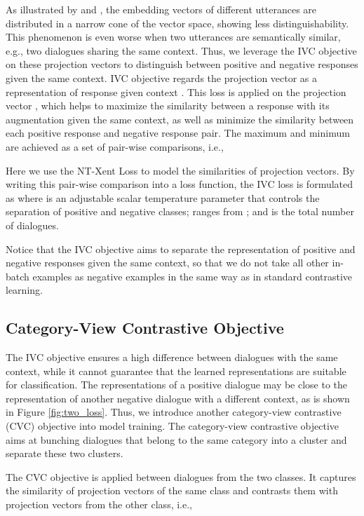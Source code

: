 \documentclass[letterpaper]{article} \usepackage{aaai22}  \usepackage{times}  \usepackage{helvet}  \usepackage{courier}  \usepackage[hyphens]{url}  \usepackage{graphicx} \urlstyle{rm} \def\UrlFont{\rm}  \usepackage{natbib}  \usepackage{caption} \DeclareCaptionStyle{ruled}{labelfont=normalfont,labelsep=colon,strut=off} \frenchspacing  \setlength{\pdfpagewidth}{8.5in}  \setlength{\pdfpageheight}{11in}  \usepackage{algorithm}
\begin{document}
As illustrated by \citet{ethayarajh-2019-contextual} and \citet{li-etal-2020-sentence}, the embedding vectors of different utterances are distributed in a narrow cone of the vector space, showing less distinguishability. This phenomenon is even worse when two utterances are semantically similar, e.g., two dialogues sharing the same context. Thus, we leverage the IVC objective on these projection vectors  to distinguish between positive and negative responses given the same context. IVC objective regards the projection vector  as a representation of response  given context . This loss is applied on the projection vector , which helps to maximize the similarity between a response with its augmentation given the same context, as well as minimize the similarity between each positive response and negative response pair. The maximum and minimum are achieved as a set of pair-wise comparisons, i.e.,

Here we use the NT-Xent Loss \cite{chen2020simple} to model the similarities of projection vectors. By writing this pair-wise comparison into a loss function, the IVC loss is formulated as 
 where  is an adjustable scalar temperature parameter that controls the separation of positive and negative classes;  ranges from ; and  is the total number of dialogues.

Notice that the IVC objective aims to separate the representation of positive and negative responses given the same context, so that we do not take all other in-batch examples as negative examples in the same way as in standard contrastive learning.

\subsection{Category-View Contrastive Objective}
\label{sec:cat_cl}

The IVC objective ensures a high difference between dialogues with the same context, while it cannot guarantee that the learned representations are suitable for classification. The representations of a positive dialogue may be close to the representation of another negative dialogue with a different context, as is shown in Figure \ref{fig:two_loss}. Thus, we introduce another category-view contrastive (CVC) objective into model training. The category-view contrastive objective aims at bunching dialogues that belong to the same category into a cluster and separate these two clusters.

The CVC objective is applied between dialogues from the two classes. It captures the similarity of projection vectors of the same class and contrasts them with projection vectors from the other class, i.e.,
\end{document}
